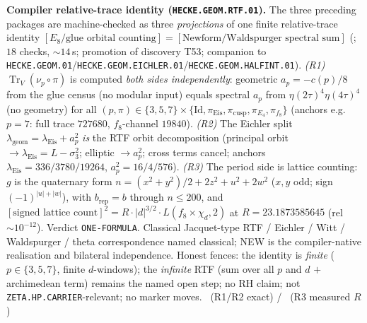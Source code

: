 \documentclass[11pt,a4paper]{article}
\theoremstyle{definition}
\begin{document}
\par\smallskip\noindent\textbf{Compiler relative-trace identity
(\texttt{HECKE.GEOM.RTF.01}).}
The three preceding packages are machine-checked as three \emph{projections} of one finite
relative-trace identity
$[\text{$E_8$/glue orbital counting}]=[\text{Newform/Waldspurger spectral sum}]$
(; $18$ checks, $\sim14$\,s; promotion of discovery
T53; companion to \texttt{HECKE.GEOM.01}/\allowbreak\texttt{HECKE.GEOM.EICHLER.01}/\allowbreak\texttt{HECKE.GEOM.HALFINT.01}).
\emph{(R1)} $\operatorname{Tr}_V(\nu_p\circ\pi)$ is computed \emph{both sides independently}:
geometric $a_p=-c(p)/8$ from the glue census (no modular input) equals spectral $a_p$ from
$\eta(2\tau)^4\eta(4\tau)^4$ (no geometry) for all
$(p,\pi)\in\{3,5,7\}\times\{\mathrm{Id},\pi_{\mathrm{Eis}},\pi_{\mathrm{cusp}},\pi_{E_4},\pi_{f_8}\}$
(anchors e.g.\ $p{=}7$: full trace $727680$, $f_8$-channel $19840$).
\emph{(R2)} The Eichler split $\lambda_{\mathrm{geom}}=\lambda_{\mathrm{Eis}}+a_p^2$
\emph{is} the RTF orbit decomposition (principal orbit $\to\lambda_{\mathrm{Eis}}=L-\sigma_3^2$;
elliptic $\to a_p^2$; cross terms cancel; anchors
$\lambda_{\mathrm{Eis}}=336/3780/19264$, $a_p^2=16/4/576$).
\emph{(R3)} The period side is lattice counting: $g$ is the quaternary form
$n=(x^2+y^2)/2+2z^2+u^2+2w^2$ ($x,y$ odd; sign $(-1)^{|u|+|w|}$), with
$b_{\mathrm{rep}}=b$ through $n\le200$, and
$[\text{signed lattice count}]^2=R\cdot|d|^{3/2}\cdot L(f_8\times\chi_d,2)$ at
$R=23.1873585645$ (rel~$\sim10^{-12}$). Verdict \texttt{ONE-FORMULA}.
Classical Jacquet-type RTF / Eichler / Witt / Waldspurger / theta correspondence named
classical; NEW is the compiler-native realisation and bilateral independence.
Honest fences: the identity is \emph{finite} ($p\in\{3,5,7\}$, finite $d$-windows); the
\emph{infinite} RTF (sum over all $p$ and $d$ $+$ archimedean term) remains the named open
step; no RH claim; not \texttt{ZETA.HP.CARRIER}-relevant; no marker moves.
\mE\ (R1/R2 exact) / \mC\ (R3 measured $R$)
\end{document}
